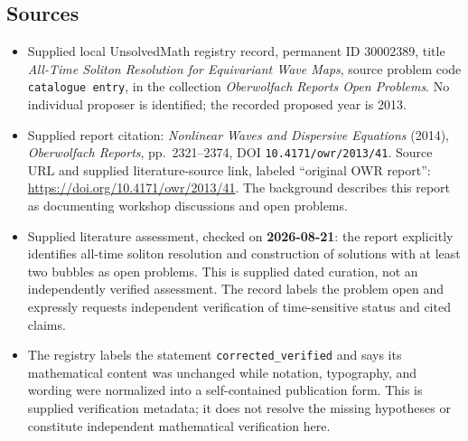 \documentclass[11pt]{article}
\begin{document}
\subsection{Sources}
\begin{itemize}
\item Supplied local UnsolvedMath registry record, permanent ID \(30002389\), title \emph{All-Time Soliton Resolution for Equivariant Wave Maps}, source problem code \texttt{catalogue entry}, in the collection \emph{Oberwolfach Reports Open Problems}. No individual proposer is identified; the recorded proposed year is 2013.
\item Supplied report citation: \emph{Nonlinear Waves and Dispersive Equations} (2014), \emph{Oberwolfach Reports}, pp.\ 2321--2374, DOI \texttt{10.4171/owr/2013/41}. Source URL and supplied literature-source link, labeled ``original OWR report'': \url{https://doi.org/10.4171/owr/2013/41}. The background describes this report as documenting workshop discussions and open problems.
\item Supplied literature assessment, checked on \textbf{2026-08-21}: the report explicitly identifies all-time soliton resolution and construction of solutions with at least two bubbles as open problems. This is supplied dated curation, not an independently verified assessment. The record labels the problem open and expressly requests independent verification of time-sensitive status and cited claims.
\item The registry labels the statement \texttt{corrected\_verified} and says its mathematical content was unchanged while notation, typography, and wording were normalized into a self-contained publication form. This is supplied verification metadata; it does not resolve the missing hypotheses or constitute independent mathematical verification here.
\end{itemize}
\end{document}

